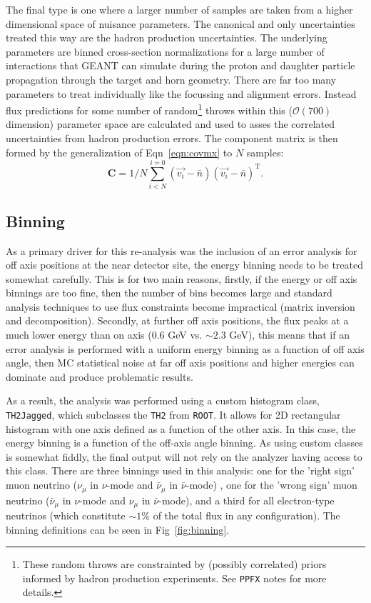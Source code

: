 \documentclass{article}
\begin{document}
The final type is one where a larger number of samples are taken from a higher dimensional space of nuisance parameters. The canonical and only uncertainties treated this way are the hadron production uncertainties. The underlying parameters are binned cross-section normalizations for a large number of interactions that GEANT can simulate during the proton and daughter particle propagation through the target and horn geometry. There are far too many parameters to treat individually like the focussing and alignment errors. Instead flux predictions for some number of random\footnote{These random throws are constrainted by (possibly correlated) priors informed by hadron production experiments. See \texttt{PPFX} notes\cite{} for more details.} throws within this ($\mathcal{O}\left(700\right)$ dimension) parameter space are calculated and used to asses the correlated uncertainties from hadron production errors. The component matrix is then formed by the generalization of Eqn~\ref{eqn:covmx} to $N$ samples:
\[\mathbf{C} = 1/N\sum^{i=0}_{i<N} \left(\vec{v_{i}}-\bar{n}\right)\left(\vec{v_{i}}-\bar{n}\right)^{\mathrm{T}}\label{eqn:covmxN}.\]

\subsection{Binning}

As a primary driver for this re-analysis was the inclusion of an error analysis for off axis positions at the near detector site, the energy binning needs to be treated somewhat carefully. This is for two main reasons, firstly, if the energy or off axis binnings are too fine, then the number of bins becomes large and standard analysis techniques to use flux constraints become impractical (matrix inversion and decomposition). Secondly, at further off axis positions, the flux peaks at a much lower energy than on axis ($0.6$ GeV vs. $\sim 2.3$ GeV), this means that if an error analysis is performed with a uniform energy binning as a function of off axis angle, then MC statistical noise at far off axis positions and higher energies can dominate and produce problematic results.

As a result, the analysis was performed using a custom histogram class, \texttt{TH2Jagged}, which subclasses the \texttt{TH2} from \texttt{ROOT}. It allows for 2D rectangular histogram with one axis defined as a function of the other axis. In this case, the energy binning is a function of the off-axis angle binning. As using custom classes is somewhat fiddly, the final output will not rely on the analyzer having access to this class. There are three binnings used in this analysis: one for the 'right sign' muon neutrino ($\nu_{\mu}$ in $\nu$-mode and $\bar{\nu}_{\mu}$ in $\bar{\nu}$-mode) , one for the 'wrong sign' muon neutrino ($\bar{\nu}_{\mu}$ in $\nu$-mode and $\nu_{\mu}$ in $\bar{\nu}$-mode), and a third for all electron-type neutrinos (which constitute $\sim 1\% $ of the total flux in any configuration). The binning definitions can be seen in Fig~\ref{fig:binning}.
\end{document}
